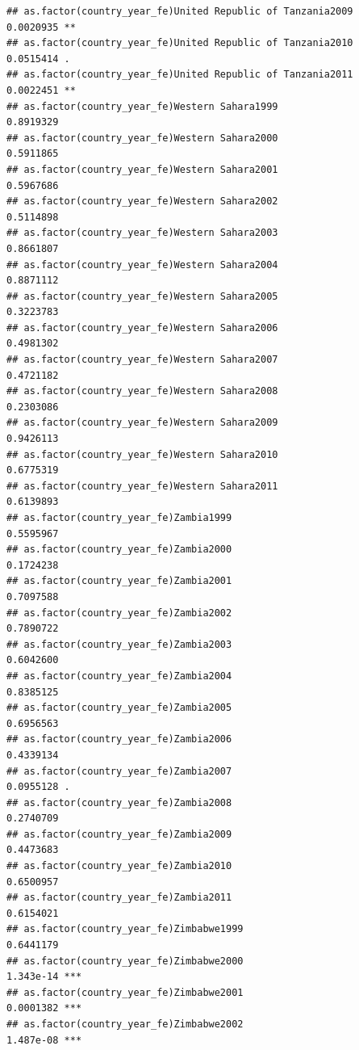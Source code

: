 \documentclass[
  a4paper,
]{article}
\begin{document}
\begin{verbatim}
## as.factor(country_year_fe)United Republic of Tanzania2009      0.0020935 ** 
## as.factor(country_year_fe)United Republic of Tanzania2010      0.0515414 .  
## as.factor(country_year_fe)United Republic of Tanzania2011      0.0022451 ** 
## as.factor(country_year_fe)Western Sahara1999                   0.8919329    
## as.factor(country_year_fe)Western Sahara2000                   0.5911865    
## as.factor(country_year_fe)Western Sahara2001                   0.5967686    
## as.factor(country_year_fe)Western Sahara2002                   0.5114898    
## as.factor(country_year_fe)Western Sahara2003                   0.8661807    
## as.factor(country_year_fe)Western Sahara2004                   0.8871112    
## as.factor(country_year_fe)Western Sahara2005                   0.3223783    
## as.factor(country_year_fe)Western Sahara2006                   0.4981302    
## as.factor(country_year_fe)Western Sahara2007                   0.4721182    
## as.factor(country_year_fe)Western Sahara2008                   0.2303086    
## as.factor(country_year_fe)Western Sahara2009                   0.9426113    
## as.factor(country_year_fe)Western Sahara2010                   0.6775319    
## as.factor(country_year_fe)Western Sahara2011                   0.6139893    
## as.factor(country_year_fe)Zambia1999                           0.5595967    
## as.factor(country_year_fe)Zambia2000                           0.1724238    
## as.factor(country_year_fe)Zambia2001                           0.7097588    
## as.factor(country_year_fe)Zambia2002                           0.7890722    
## as.factor(country_year_fe)Zambia2003                           0.6042600    
## as.factor(country_year_fe)Zambia2004                           0.8385125    
## as.factor(country_year_fe)Zambia2005                           0.6956563    
## as.factor(country_year_fe)Zambia2006                           0.4339134    
## as.factor(country_year_fe)Zambia2007                           0.0955128 .  
## as.factor(country_year_fe)Zambia2008                           0.2740709    
## as.factor(country_year_fe)Zambia2009                           0.4473683    
## as.factor(country_year_fe)Zambia2010                           0.6500957    
## as.factor(country_year_fe)Zambia2011                           0.6154021    
## as.factor(country_year_fe)Zimbabwe1999                         0.6441179    
## as.factor(country_year_fe)Zimbabwe2000                         1.343e-14 ***
## as.factor(country_year_fe)Zimbabwe2001                         0.0001382 ***
## as.factor(country_year_fe)Zimbabwe2002                         1.487e-08 ***

\end{verbatim}
\end{document}
